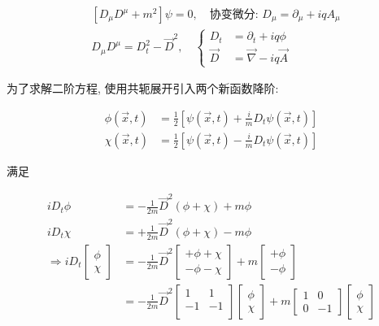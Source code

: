 \documentclass[../../main.tex]{subfiles}
\begin{document}
\begin{align*}
    &\left[D_{\mu}D^{\mu} + m^{2}\right]\psi = 0,\quad \text{协变微分: }D_{\mu} = \partial_{\mu} + iqA_{\mu}\\
    &D_{\mu}D^{\mu} = D_{t}^{2} - \vec{D}^{2},\quad \left\{\begin{aligned}
        D_{t} &= \partial_{t} + iq\phi\\
        \vec{D} &= \vec{\nabla} - iq\vec{A}
    \end{aligned}\right.
\end{align*}

为了求解二阶方程, 使用共轭展开引入两个新函数降阶:

\begin{align*}
    \phi(\vec{x},t) &= \frac{1}{2}\left[\psi(\vec{x},t) + \frac{i}{m}D_{t}\psi(\vec{x},t)\right]\\
    \chi(\vec{x},t) &= \frac{1}{2}\left[\psi(\vec{x},t) - \frac{i}{m}D_{t}\psi(\vec{x},t)\right]
\end{align*}

满足

\begin{align*}
    iD_{t}\phi &= -\frac{1}{2m}\vec{D}^{2}(\phi + \chi) + m\phi\\
    iD_{t}\chi &= +\frac{1}{2m}\vec{D}^{2}(\phi + \chi) - m\phi \\
    \Rightarrow iD_{t}\begin{bmatrix}
        \phi\\
        \chi
    \end{bmatrix} &= -\frac{1}{2m}\vec{D}^{2}\begin{bmatrix}
        +\phi + \chi\\
        -\phi - \chi
    \end{bmatrix} + m\begin{bmatrix}
        +\phi\\
        -\phi
    \end{bmatrix}\\
    &= -\frac{1}{2m}\vec{D}^{2}\begin{bmatrix}
        1 & 1\\
        -1 & -1\\
    \end{bmatrix}\begin{bmatrix}
        \phi\\
        \chi
    \end{bmatrix} + m\begin{bmatrix}
        1 & 0\\
        0 & -1
    \end{bmatrix}\begin{bmatrix}
        \phi\\
        \chi
    \end{bmatrix}
\end{align*}
\end{document}
